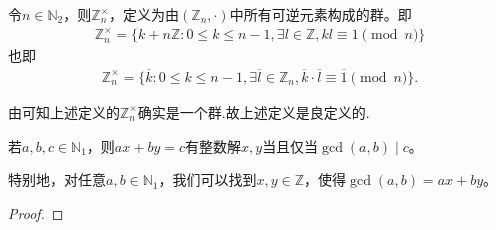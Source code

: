 \documentclass[../../main.tex]{subfiles}
\begin{document}
\begin{definition}
令$n \in \mathbb{N}_2$，则$\mathbb{Z}_n^\times$，定义为由$(\mathbb{Z}_n, \cdot)$中所有可逆元素构成的群。即
\begin{align*}
\mathbb{Z}_n^\times = \{k + n\mathbb{Z} : 0 \leqslant k \leqslant n - 1, \exists l \in \mathbb{Z}, kl \equiv 1 \pmod{n}\}
\end{align*}
也即
\begin{align*}
\mathbb{Z} _{n}^{\times}=\{\overline{k}:0\leqslant k\leqslant n-1,\exists \overline{l}\in \mathbb{Z} _n,\overline{k}\cdot \overline{l}\equiv \overline{1} \pmod{n} \}.
\end{align*}
\end{definition}
\begin{remark}
由可知上述定义的$\mathbb{Z}_n^\times$确实是一个群.故上述定义是良定义的.
\end{remark}

\begin{lemma}[Bézout定理]\label{lemma:Bézout定理}
若$a, b, c \in \mathbb{N}_1$，则$ax + by = c$有整数解$x, y$当且仅当$\gcd(a, b) \mid c$。

特别地，对任意$a, b \in \mathbb{N}_1$，我们可以找到$x, y \in \mathbb{Z}$，使得$\gcd(a, b) = ax + by$。
\end{lemma}
\begin{proof}

\end{proof}
\end{document}
